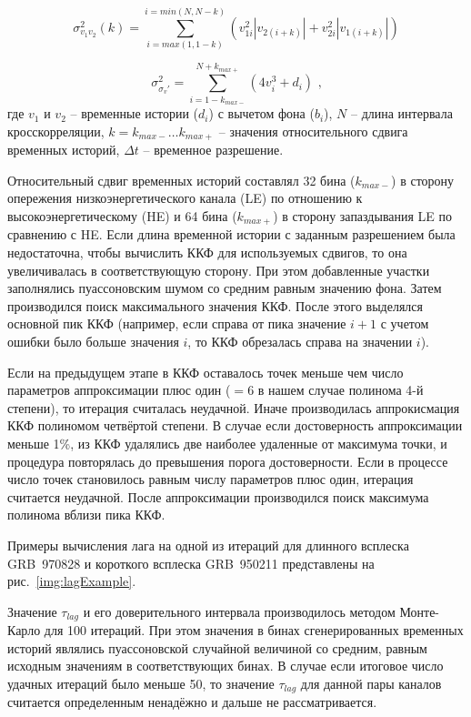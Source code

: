 \begin{equation}
\sigma_{v_1 v_2}^2(k) = \sum^{i=min(N, N-k)}_{i=max(1, 1-k)} (v_{1i}^2 |v_{2(i+k)}| + v_{2i}^2 |v_{1(i+k)}|)
\end{equation}

\begin{equation}
\sigma_{\sigma_{v}'}^2 = \sum_{i=1-k_{max-}}^{N+k_{max+}}(4 v_i^3 +d_i)\mbox{ ,}
\end{equation}
где $v_1$ и $v_2$ -- временные истории ($d_i$) с вычетом фона ($b_i$), $N$ -- длина интервала кросскорреляции, $k=k_{max-} \dotso k_{max+}$ -- значения относительного сдвига временных историй, $\Delta t$ -- временное разрешение.

Относительный сдвиг временных историй составлял 32 бина ($k_{max-}$) в сторону опережения низкоэнергетического канала (LE) по отношению к высокоэнергетическому (HE) и 64 бина ($k_{max+}$) в сторону запаздывания LE по сравнению с HE. Если длина временной истории с заданным разрешением была недостаточна, чтобы вычислить ККФ для используемых сдвигов, то она увеличивалась в соответствующую сторону. При этом добавленные участки заполнялись пуассоновским шумом со средним равным значению фона. Затем производился поиск максимального значения ККФ. После этого выделялся основной пик ККФ (например, если справа от пика значение $i+1$ с учетом ошибки было больше значения $i$, то ККФ обрезалась справа на значении $i$). 

Если на предыдущем этапе в ККФ оставалось точек меньше чем число параметров аппроксимации плюс один ($=6$ в нашем случае полинома 4-й степени), то итерация считалась неудачной. Иначе производилась аппрокисмация ККФ полиномом четвёртой степени. В случае если достоверность аппроксимации меньше 1\%, из ККФ удалялись две наиболее удаленные от максимума точки, и процедура повторялась до превышения порога достоверности. Если в процессе число точек становилось равным числу параметров плюс один, итерация считается неудачной. После аппроксимации производился поиск максимума полинома вблизи пика ККФ.

Примеры вычисления лага на одной из итераций для длинного всплеска GRB~970828 и короткого всплеска GRB~950211 представлены на рис.~\ref{img:lagExample}.

Значение  $\tau_{lag}$  и его доверительного интервала производилось методом  Монте-Карло для 100 итераций. При этом значения в бинах сгенерированных временных историй являлись пуассоновской случайной величиной со средним, равным исходным значениям в соответствующих бинах. В случае если итоговое число удачных итераций было меньше 50, то значение $\tau_{lag}$  для данной пары каналов считается определенным ненадёжно и дальше не рассматривается.

